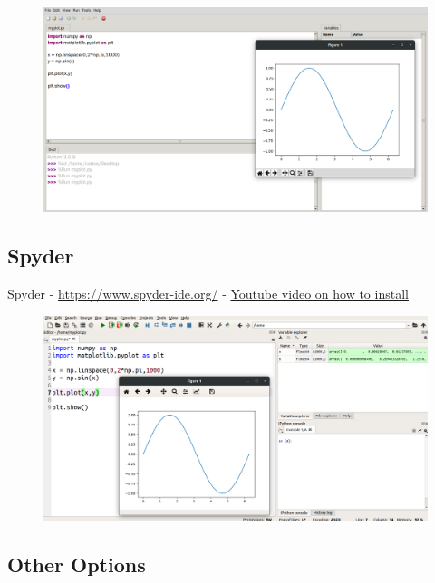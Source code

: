 \begin{figure}[H]
  \begin{center}
    \includegraphics[width=\textwidth]{Figures/Thonny.png}
  \end{center}
\end{figure}

\subsection{Spyder}

Spyder - \url{https://www.spyder-ide.org/} - \href{https://www.youtube.com/watch?v=OjYwET-6QtE&list=PL_D7_GvGz-v1RsDs_OdNW65qRjEjmpfQx&index=35}{Youtube video on how to install}

\begin{figure}[H]
  \begin{center}
    \includegraphics[width=\textwidth]{Figures/Spyder.png}
  \end{center}
\end{figure}

\subsection{Other Options}


